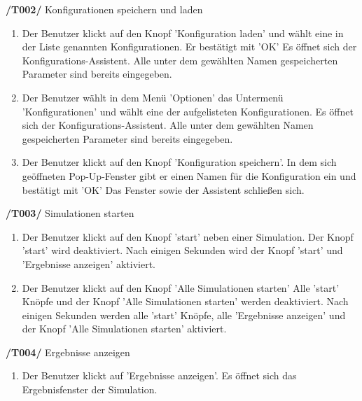 \textbf{/T002/} Konfigurationen speichern und laden
\begin{enumerate}
\item {}
		{Der Benutzer klickt auf den Knopf 'Konfiguration laden' und wählt eine in der Liste genannten Konfigurationen. Er bestätigt mit 'OK'}
		{Es öffnet sich der Konfigurations-Assistent. Alle unter dem gewählten Namen gespeicherten Parameter sind bereits eingegeben.}
		
\item {}
		{Der Benutzer wählt in dem Menü 'Optionen' das Untermenü 'Konfigurationen' und wählt eine der aufgelisteten Konfigurationen.}
		{Es öffnet sich der Konfigurations-Assistent. Alle unter dem gewählten Namen gespeicherten Parameter sind bereits eingegeben.}

\item {}
		{Der Benutzer klickt auf den Knopf 'Konfiguration speichern'. In dem sich geöffneten Pop-Up-Fenster gibt er einen Namen für die Konfiguration ein und bestätigt mit 'OK'}
		{Das Fenster sowie der Assistent schließen sich.}
\end{enumerate}

\textbf{/T003/} Simulationen starten
\begin{enumerate}
\item {}
		{Der Benutzer klickt auf den Knopf 'start' neben einer Simulation.}
		{Der Knopf 'start' wird deaktiviert. Nach einigen Sekunden wird der Knopf 'start' und 'Ergebnisse anzeigen' aktiviert.}
		
\item {}
		{Der Benutzer klickt auf den Knopf 'Alle Simulationen starten'}
		{Alle 'start' Knöpfe und der Knopf 'Alle Simulationen starten' werden deaktiviert. Nach einigen Sekunden werden alle 'start' Knöpfe, alle 'Ergebnisse anzeigen' und der Knopf 'Alle Simulationen starten' aktiviert.}
\end{enumerate}

\textbf{/T004/} Ergebnisse anzeigen
\begin{enumerate}
\item {}
		{Der Benutzer klickt auf 'Ergebnisse anzeigen'.}
		{Es öffnet sich das Ergebnisfenster der Simulation.}
\end{enumerate}

